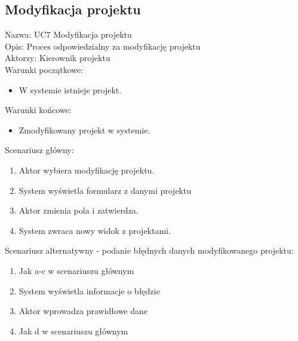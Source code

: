 \subsection{Modyfikacja projektu}
\begin{adjustwidth}{5em}{0pt}
Nazwa: UC7 Modyfikacja projektu\\
Opis: Proces odpowiedzialny za modyfikację projektu\\
Aktorzy: Kierownik projektu \\
Warunki początkowe:
\begin{itemize}
\item W systemie istnieje projekt.
\end{itemize}
Warunki końcowe:
\begin{itemize}
\item Zmodyfikowany projekt w systemie.
\end{itemize}
Scenariusz główny:
\begin{enumerate}
\item Aktor wybiera modyfikację projektu.
\item System wyświetla formularz z danymi projektu
\item Aktor zmienia pola i zatwierdza.
\item System zwraca nowy widok z projektami.
\end{enumerate}
Scenariusz alternatywny - podanie błędnych danych modyfikowanego projektu: 
\begin{enumerate}
\item Jak a-c w scenariuszu głównym
\item System wyświetla informacje o błędzie
\item Aktor wprowadza prawidłowe dane
\item Jak d w scenariuszu głównym
\end{enumerate}
\end{adjustwidth}


